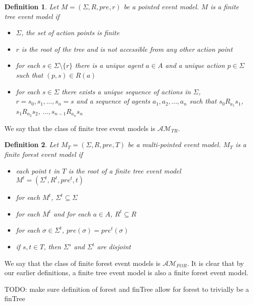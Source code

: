 \documentclass[12pt, a4paper, titlepage]{scrartcl}
\newtheorem{defn}{Definition}[section]
\numberwithin{equation}{section}
\newcommand{\eventClass}{\mathcal{AM}}
\newcommand{\treeClass}{\eventClass_{TR}}
\newcommand{\forestClass}{\eventClass_{FOR}}
\begin{document}
\begin{defn} \label{finTree}
Let $M = (\Sigma, R, pre, r)$ be a pointed event model.
$M$ is a finite tree event model if
\begin{itemize}
	\item $\Sigma$, the set of action points is finite
	\item $r$ is the root of the tree and is not accessible from any other action point
	\item for each $s \in \Sigma \setminus \{ r \}$ there is a unique agent $a \in A$ and a unique
	action $p \in \Sigma$ such that $(p,s) \in R(a)$
	\item for each $s \in \Sigma$ there exists a unique sequence of actions in $\Sigma$, $r = s_0,
	s_1, \ldots, s_n = s$ and a sequence of agents $a_1, a_2, \ldots, a_n$ such that $s_0 R_{a_1}
	s_1$, $s_1 R_{a_2} s_2$, $\ldots, s_{n-1} R_{a_n} s_n$
\end{itemize}
\end{defn}

We say that the class of finite tree event models is $\treeClass$.

\begin{defn} \label{forest}
Let $M_T = (\Sigma, R, pre, T)$ be a multi-pointed event model.
$M_T$ is a finite forest event model if
\begin{itemize}
	\item each point $t$ in $T$ is the root of a finite tree event model $M^t = (\Sigma^t, R^t,
	pre^t, t)$
	\item for each $M^t$, $\Sigma^t \subseteq \Sigma$
	\item for each $M^t$ and for each $a \in A$, $R^t \subseteq R$
	\item for each $\sigma \in \Sigma^t$, $pre(\sigma) = pre^t(\sigma)$
	\item if $s, t \in T$, then $\Sigma^s$ and $\Sigma^t$ are disjoint
\end{itemize}
\end{defn}

We say that the class of finite forest event models is $\forestClass$.
It is clear that by our earlier definitions, a finite tree event model is also a finite forest event
model.

TODO: make sure definition of forest and finTree allow for forest to trivially be a finTree
\end{document}
